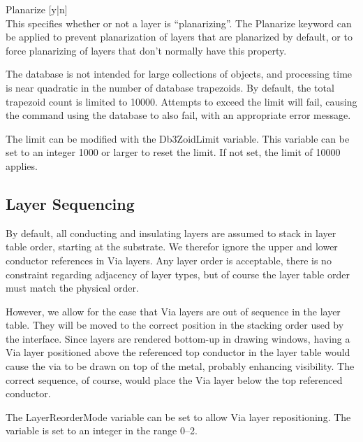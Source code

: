 \begin{description}
\item{{\vt Planarize} [{\vt y}|{\vt n}]}\\
This specifies whether or not a layer is ``planarizing''.  The {\et
Planarize} keyword can be applied to prevent planarization of layers
that are planarized by default, or to force planarizing of layers that
don't normally have this property.
\end{description}

The database is not intended for large collections of objects, and
processing time is near quadratic in the number of database
trapezoids.  By default, the total trapezoid count is limited to
10000.  Attempts to exceed the limit will fail, causing the command
using the database to also fail, with an appropriate error message.

The limit can be modified with the {\et Db3ZoidLimit} variable.  This
variable can be set to an integer 1000 or larger to reset the limit. 
If not set, the limit of 10000 applies.

\subsection{Layer Sequencing}
     
By default, all conducting and insulating layers are assumed to stack
in layer table order, starting at the substrate.  We therefor ignore
the upper and lower conductor references in {\et Via} layers.  Any
layer order is acceptable, there is no constraint regarding adjacency
of layer types, but of course the layer table order must match the
physical order.

However, we allow for the case that {\et Via} layers are out of
sequence in the layer table.  They will be moved to the correct
position in the stacking order used by the interface.  Since layers
are rendered bottom-up in drawing windows, having a {\et Via} layer
positioned above the referenced top conductor in the layer table would
cause the via to be drawn on top of the metal, probably enhancing
visibility.  The correct sequence, of course, would place the {\et
Via} layer below the top referenced conductor.

The {\et LayerReorderMode} variable can be set to allow {\et Via}
layer repositioning.  The variable is set to an integer in the range
0--2.

